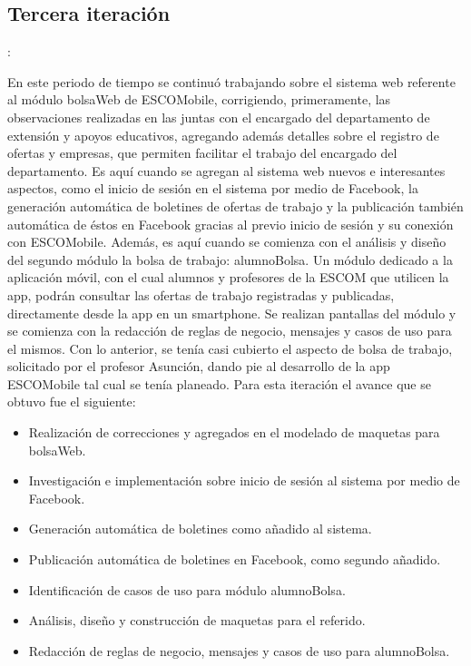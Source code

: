 
\subsection{Tercera iteración}: 

\noindent
En este periodo de tiempo se continuó trabajando sobre el sistema web referente al módulo bolsaWeb de ESCOMobile, corrigiendo, primeramente, las observaciones realizadas en las juntas con el encargado del departamento de extensión y apoyos educativos, agregando además detalles sobre el registro de ofertas y empresas, que permiten facilitar el trabajo del encargado del departamento. 
\newline
Es aquí cuando se agregan al sistema web nuevos e interesantes aspectos, como el inicio de sesión en el sistema por medio de Facebook, la generación automática de boletines de ofertas de trabajo y la publicación también automática de éstos en Facebook gracias al previo inicio de sesión y su conexión con ESCOMobile.
\newline
\newline
Además, es aquí cuando se comienza con el análisis y diseño del segundo módulo la bolsa de trabajo: alumnoBolsa. Un módulo dedicado a la aplicación móvil, con el cual alumnos y profesores de la ESCOM que utilicen la app, podrán consultar las ofertas de trabajo registradas y publicadas, directamente desde la app en un smartphone. Se realizan pantallas del módulo y se comienza con la redacción de reglas de negocio, mensajes y casos de uso para el mismos.
\newline
Con lo anterior, se tenía casi cubierto el aspecto de bolsa de trabajo, solicitado por el profesor Asunción, dando pie al desarrollo de la app ESCOMobile tal cual se tenía planeado. 
\newline
Para esta iteración el avance que se obtuvo fue el siguiente:
\begin{itemize}
	\item Realización de correcciones y agregados en el modelado de maquetas para bolsaWeb.
	\item Investigación e implementación sobre inicio de sesión al sistema por medio de Facebook.
	\item Generación automática de boletines como añadido al sistema. 
	\item Publicación automática de boletines en Facebook, como segundo añadido.
	\item Identificación de casos de uso para módulo alumnoBolsa.
	\item Análisis, diseño y construcción de maquetas para el referido.
	\item Redacción de reglas de negocio, mensajes y casos de uso para alumnoBolsa.
\end{itemize}

